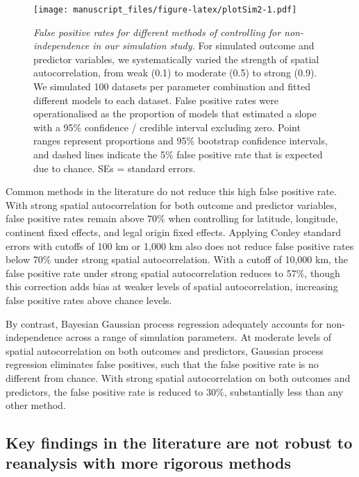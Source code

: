 \documentclass[
  english,
  man,floatsintext]{apa6}
\begin{document}
\begin{figure}
\centering
\texttt{[image: manuscript\_files/figure-latex/plotSim2-1.pdf]}
\caption{\label{fig:plotSim2}\emph{False positive rates for different methods of controlling for non-independence in our simulation study.} For simulated outcome and predictor variables, we systematically varied the strength of spatial autocorrelation, from weak (0.1) to moderate (0.5) to strong (0.9). We simulated 100 datasets per parameter combination and fitted different models to each dataset. False positive rates were operationalised as the proportion of models that estimated a slope with a 95\% confidence / credible interval excluding zero. Point ranges represent proportions and 95\% bootstrap confidence intervals, and dashed lines indicate the 5\% false positive rate that is expected due to chance. SEs = standard errors.}
\end{figure}

Common methods in the literature do not reduce this high false positive rate. With strong spatial autocorrelation for both outcome and predictor variables, false positive rates remain above 70\% when controlling for latitude, longitude, continent fixed effects, and legal origin fixed effects. Applying Conley standard errors with cutoffs of 100 km or 1,000 km also does not reduce false positive rates below 70\% under strong spatial autocorrelation. With a cutoff of 10,000 km, the false positive rate under strong spatial autocorrelation reduces to 57\%, though this correction adds bias at weaker levels of spatial autocorrelation, increasing false positive rates above chance levels.

By contrast, Bayesian Gaussian process regression adequately accounts for non-independence across a range of simulation parameters. At moderate levels of spatial autocorrelation on both outcomes and predictors, Gaussian process regression eliminates false positives, such that the false positive rate is no different from chance. With strong spatial autocorrelation on both outcomes and predictors, the false positive rate is reduced to 30\%, substantially less than any other method.

\hypertarget{key-findings-in-the-literature-are-not-robust-to-reanalysis-with-more-rigorous-methods}{%
\subsection{Key findings in the literature are not robust to reanalysis with more rigorous methods}\label{key-findings-in-the-literature-are-not-robust-to-reanalysis-with-more-rigorous-methods}}
\end{document}
